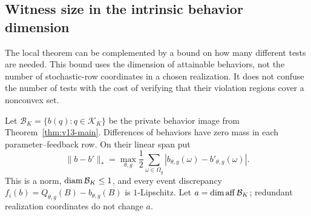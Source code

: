\subsection{Witness size in the intrinsic behavior dimension}
\label{sec:v15-witness}
The local theorem can be complemented by a bound on how many different
tests are needed. This bound uses the dimension of attainable behaviors,
not the number of stochastic-row coordinates in a chosen realization.
It does not confuse the number of tests with the cost of verifying
that their violation regions cover a nonconvex set.

Let $\mathcal B_K=\{b(q):q\in\mathcal K_K\}$ be the private behavior
image from Theorem~\ref{thm:v13-main}. Differences of behaviors have
zero mass in each parameter--feedback row. On their linear span put
\[
 \|b-b'\|_*=
       \max_{\theta,g}\frac12\sum_{\omega\in\Omega_g}
                    |b_{\theta,g}(\omega)-b'_{\theta,g}(\omega)|.
\]
This is a norm, $\operatorname{diam}\mathcal B_K\le1$, and every event discrepancy
$f_i(b)=Q_{\theta,g}(B)-b_{\theta,g}(B)$ is $1$-Lipschitz. Let
$a=\dim\operatorname{aff}\mathcal B_K$; redundant realization coordinates do not
change $a$.

